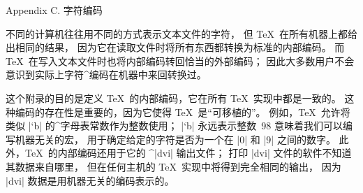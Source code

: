 


\beginchapter Appendix C. 字符编码

\ninepoint
不同的计算机往往用不同的方式表示文本文件的字符，
但 \TeX\ 在所有机器上都给出相同的结果，
因为它在读取文件时将所有东西都转换为标准的内部编码。
而 \TeX\ 在写入文本文件时也将内部编码转回恰当的外部编码；
因此大多数用户不会意识到实际上字符^{编码}在机器中来回转换过。

这个附录的目的是定义 \TeX\ 的内部编码，它在所有 \TeX\ 实现中都是一致的。
这种编码的存在性是重要的，因为它使得 \TeX\ 是``可移植的''。
例如，\TeX\ 允许将类似 |`b| 的^{字母表常数}作为整数使用；
|`b| 永远表示整数~98 意味着我们可以编写机器无关的宏，
用于确定给定的字符是否为一个在 |0| 和 |9| 之间的数字。
此外，\TeX\ 的内部编码还用于它的 ^|dvi| 输出文件；
打印 |dvi| 文件的软件不知道其数据来自哪里，
但在任何主机的 \TeX\ 实现中将得到完全相同的输出，
因为 |dvi| 数据是用机器无关的编码表示的。

